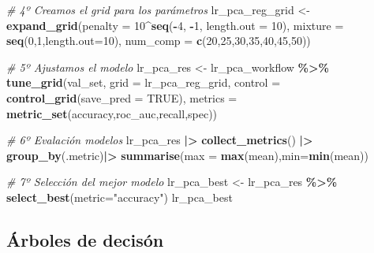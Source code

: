 \documentclass[12pt,a4paper,]{book}
\newenvironment{Shaded}{\begin{snugshade}}{\end{snugshade}}
\newcommand{\AttributeTok}[1]{\textcolor[rgb]{0.13,0.29,0.53}{#1}}
\newcommand{\CommentTok}[1]{\textcolor[rgb]{0.56,0.35,0.01}{\textit{#1}}}
\newcommand{\ConstantTok}[1]{\textcolor[rgb]{0.56,0.35,0.01}{#1}}
\newcommand{\DecValTok}[1]{\textcolor[rgb]{0.00,0.00,0.81}{#1}}
\newcommand{\FunctionTok}[1]{\textcolor[rgb]{0.13,0.29,0.53}{\textbf{#1}}}
\newcommand{\NormalTok}[1]{#1}
\newcommand{\OtherTok}[1]{\textcolor[rgb]{0.56,0.35,0.01}{#1}}
\newcommand{\SpecialCharTok}[1]{\textcolor[rgb]{0.81,0.36,0.00}{\textbf{#1}}}
\newcommand{\StringTok}[1]{\textcolor[rgb]{0.31,0.60,0.02}{#1}}
\numberwithin{dummy}{section}
\theoremstyle{ocrenumbox}
\theoremstyle{blacknumex}
\theoremstyle{blacknumbox}
\theoremstyle{ocrenum}
\theoremstyle{ocrenum}
\begin{document}
\begin{Shaded}
\begin{Highlighting}[]
\CommentTok{\# 4º Creamos el grid para los parámetros}
\NormalTok{lr\_pca\_reg\_grid }\OtherTok{\textless{}{-}} \FunctionTok{expand\_grid}\NormalTok{(}\AttributeTok{penalty =} \DecValTok{10}\SpecialCharTok{\^{}}\FunctionTok{seq}\NormalTok{(}\SpecialCharTok{{-}}\DecValTok{4}\NormalTok{, }\SpecialCharTok{{-}}\DecValTok{1}\NormalTok{, }\AttributeTok{length.out =} \DecValTok{10}\NormalTok{),}
                               \AttributeTok{mixture =} \FunctionTok{seq}\NormalTok{(}\DecValTok{0}\NormalTok{,}\DecValTok{1}\NormalTok{,}\AttributeTok{length.out=}\DecValTok{10}\NormalTok{),}
                               \AttributeTok{num\_comp =} \FunctionTok{c}\NormalTok{(}\DecValTok{20}\NormalTok{,}\DecValTok{25}\NormalTok{,}\DecValTok{30}\NormalTok{,}\DecValTok{35}\NormalTok{,}\DecValTok{40}\NormalTok{,}\DecValTok{45}\NormalTok{,}\DecValTok{50}\NormalTok{))}

\CommentTok{\# 5º Ajustamos el modelo}
\NormalTok{lr\_pca\_res }\OtherTok{\textless{}{-}} 
\NormalTok{  lr\_pca\_workflow }\SpecialCharTok{\%\textgreater{}\%} 
  \FunctionTok{tune\_grid}\NormalTok{(val\_set,}
            \AttributeTok{grid =}\NormalTok{ lr\_pca\_reg\_grid,}
            \AttributeTok{control =} \FunctionTok{control\_grid}\NormalTok{(}\AttributeTok{save\_pred =} \ConstantTok{TRUE}\NormalTok{),}
            \AttributeTok{metrics =} \FunctionTok{metric\_set}\NormalTok{(accuracy,roc\_auc,recall,spec))}

\CommentTok{\# 6º Evalación modelos}
\NormalTok{lr\_pca\_res }\SpecialCharTok{|\textgreater{}} 
  \FunctionTok{collect\_metrics}\NormalTok{() }\SpecialCharTok{|\textgreater{}} 
  \FunctionTok{group\_by}\NormalTok{(.metric)}\SpecialCharTok{|\textgreater{}} 
  \FunctionTok{summarise}\NormalTok{(}\AttributeTok{max =} \FunctionTok{max}\NormalTok{(mean),}\AttributeTok{min=}\FunctionTok{min}\NormalTok{(mean))}

\CommentTok{\# 7º Selección del mejor modelo}
\NormalTok{lr\_pca\_best }\OtherTok{\textless{}{-}} 
\NormalTok{  lr\_pca\_res }\SpecialCharTok{\%\textgreater{}\%} 
  \FunctionTok{select\_best}\NormalTok{(}\AttributeTok{metric=}\StringTok{"accuracy"}\NormalTok{)}
\NormalTok{lr\_pca\_best}
\end{Highlighting}
\end{Shaded}

\hypertarget{uxe1rboles-de-decisuxf3n}{%
\subsection{Árboles de decisón}\label{uxe1rboles-de-decisuxf3n}}
\end{document}
